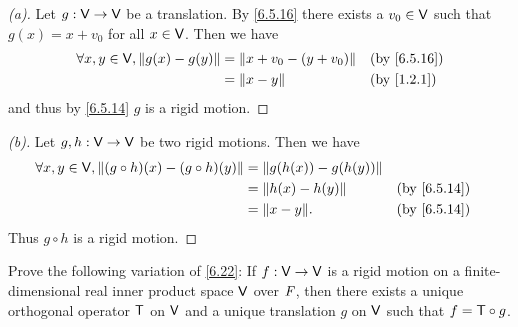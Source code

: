 \begin{proof}[(a)]
  Let \(g : \mathsf{V} \to \mathsf{V}\) be a translation.
  By \cref{6.5.16} there exists a \(v_0 \in \mathsf{V}\) such that \(g(x) = x + v_0\) for all \(x \in \mathsf{V}\).
  Then we have
  \begin{align*}
    \forall x, y \in \V, \norm{g(x) - g(y)} & = \norm{x + v_0 - (y + v_0)} &  & \by{6.5.16} \\
                                            & = \norm{x - y}               &  & \by{1.2.1}
  \end{align*}
  and thus by \cref{6.5.14} \(g\) is a rigid motion.
\end{proof}

\begin{proof}[(b)]
  Let \(g, h: \mathsf{V} \to \mathsf{V}\) be two rigid motions.
  Then we have
  \begin{align*}
    \forall x, y \in \V, \norm{(g \circ h)(x) - (g \circ h)(y)} & = \norm{g(h(x)) - g(h(y))}                  \\
                                                                & = \norm{h(x) - h(y)}       &  & \by{6.5.14} \\
                                                                & = \norm{x - y}.            &  & \by{6.5.14}
  \end{align*}
  Thus \(g \circ h\) is a rigid motion.
\end{proof}

\begin{ex}\label{ex:6.5.23}
  Prove the following variation of \cref{6.22}:
  If \(f : \mathsf{V} \to \mathsf{V}\) is a rigid motion on a finite-dimensional real inner product space \(\mathsf{V}\) over \(\mathit{F}\), then there exists a unique orthogonal operator \(\mathsf{T}\) on \(\mathsf{V}\) and a unique translation \(g\) on \(\mathsf{V}\) such that \(f = \mathsf{T} \circ g\).
\end{ex}

